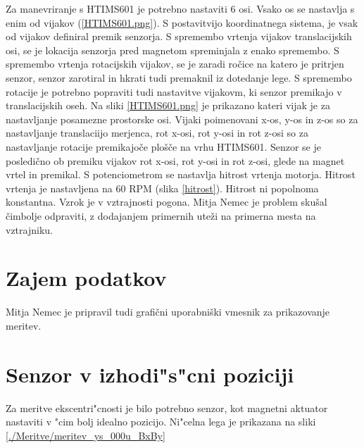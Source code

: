 Za manevriranje s HTIMS601 je potrebno nastaviti 6 osi.
Vsako os se nastavlja s enim od vijakov (\ref{HTIMS601.png}).
S postavitvijo koordinatnega sistema, je vsak od vijakov definiral premik senzorja. 
S spremembo vrtenja vijakov translacijskih osi, se je lokacija senzorja pred magnetom spreminjala z enako spremembo. S spremembo vrtenja rotacijskih vijakov, se je zaradi ročice na katero je pritrjen senzor, senzor zarotiral in hkrati tudi premaknil iz dotedanje lege. S spremembo rotacije je potrebno popraviti tudi nastavitve vijakovm, ki senzor premikajo v translacijskih oseh.
Na sliki \ref{HTIMS601.png} je prikazano kateri vijak je za nastavljanje posamezne prostorske osi. Vijaki poimenovani x-os, y-os in z-os so za nastavljanje translaciijo merjenca, rot x-osi, rot y-osi in rot z-osi so za nastavljanje rotacije premikajoče plošče na vrhu HTIMS601.
Senzor se je posledično ob premiku vijakov rot x-osi, rot y-osi in rot z-osi, glede na magnet vrtel in premikal.
S potenciometrom se nastavlja hitrost vrtenja motorja.
Hitrost vrtenja je nastavljena na 60 RPM (slika \ref{hitrost}). Hitrost ni popolnoma konstantna. Vzrok je v vztrajnosti pogona. Mitja Nemec je problem skušal čimbolje odpraviti, z dodajanjem primernih uteži na primerna mesta na vztrajniku.
 
\section{Zajem podatkov}

Mitja Nemec je pripravil tudi grafični uporabniški vmesnik za prikazovanje meritev.

\section{Senzor v izhodi"s"cni poziciji}
Za meritve ekscentri"cnosti je bilo potrebno senzor, kot magnetni aktuator nastaviti v "cim bolj idealno pozicijo. Ni"celna lega je prikazana na sliki \ref{./Meritve/meritev_ys_000u_BxBy}

